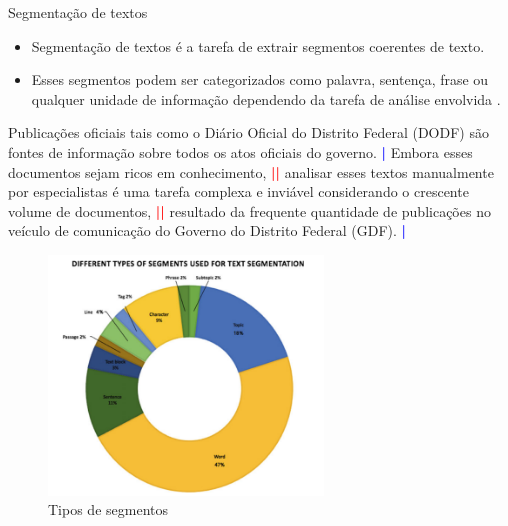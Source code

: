 \documentclass[10pt]{beamer}
\begin{document}
\begin{frame}[allowframebreaks]{Segmentação de textos}
    \begin{itemize}
        \item Segmentação de textos é a tarefa de extrair segmentos coerentes de texto.
        \item Esses segmentos podem ser categorizados como palavra, sentença, frase ou qualquer unidade de informação dependendo da tarefa de análise envolvida \cite{Irina_text_seg}.
    \end{itemize}
    
    \begin{example}
        Publicações oficiais tais como o Diário Oficial do Distrito Federal (DODF) são fontes de informação sobre todos os atos oficiais do governo. \textcolor{blue}{\textbf{|}} Embora esses documentos sejam ricos em conhecimento, \textcolor{red}{\textbf{||}} analisar esses textos manualmente por especialistas é uma tarefa complexa e inviável considerando o crescente volume de documentos, \textcolor{red}{\textbf{||}} resultado da frequente quantidade de publicações no veículo de comunicação do Governo do Distrito Federal (GDF). \textcolor{blue}{\textbf{|}}
    \end{example}
    
    \begin{figure}
        \centering
        \includegraphics[width=0.65\textwidth]{Feathergraphics/seg_types.png}
        \caption{Tipos de segmentos \cite{Irina_text_seg}}
        \label{fig:seg_types}
    \end{figure}

\end{frame}
\end{document}
